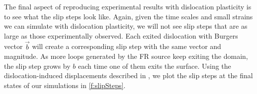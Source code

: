 

The final aspect of reproducing experimental results with dislocation plasticity is to see what the slip steps look like. Again, given the time scales and small strains we can simulate with dislocation plasticity, we will not see slip steps that are as large as those experimentally observed. Each exited dislocation with Burgers vector $\vec{b}$ will create a corresponding slip step with the same vector and magnitude. As more loops generated by the FR source keep exiting the domain, the slip step grows by $b$ each time one of them exits the surface. Using the dislocation-induced displacements described in \cite{bromage2018calculating}, we plot the slip steps at the final states of our simulations in \cref{f:slipSteps}.

